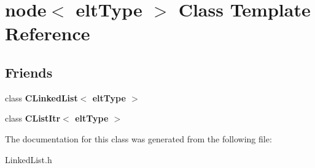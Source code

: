 \hypertarget{classnode}{\section{node$<$ elt\-Type $>$ Class Template Reference}
\label{classnode}
}
\subsection*{Friends}
\begin{DoxyCompactItemize}
\item 
\hypertarget{classnode_a1550c97b5f3ae3842b3c5dc45d7c2984}{class {\bfseries C\-Linked\-List$<$ elt\-Type $>$}}\label{classnode_a1550c97b5f3ae3842b3c5dc45d7c2984}

\item 
\hypertarget{classnode_ac76a869ca4ec3b044e17f832fd9e1de1}{class {\bfseries C\-List\-Itr$<$ elt\-Type $>$}}\label{classnode_ac76a869ca4ec3b044e17f832fd9e1de1}

\end{DoxyCompactItemize}


The documentation for this class was generated from the following file\-:\begin{DoxyCompactItemize}
\item 
Linked\-List.\-h\end{DoxyCompactItemize}
